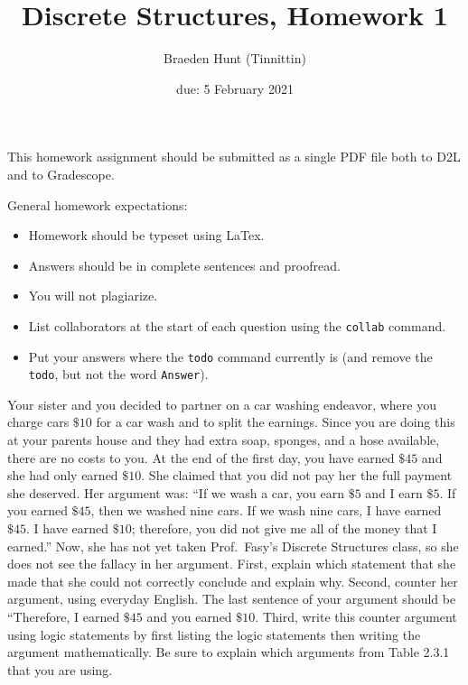 \documentclass{article}
\title{Discrete Structures, Homework 1}
\author{Braeden Hunt (Tinnittin)}
\date{due: 5 February 2021}
\begin{document}
\maketitle

This homework assignment should be
submitted as a single PDF file both to D2L and to Gradescope.

General homework expectations:
\begin{itemize}
    \item Homework should be typeset using LaTex.
    \item Answers should be in complete sentences and proofread.
    \item You will not plagiarize.  \item List collaborators at the start of each question using the \texttt{collab} command.
    \item Put your answers where the \texttt{todo} command currently is (and
        remove the \texttt{todo}, but not the word \texttt{Answer}).
\end{itemize}

 
Your sister and you decided to partner on a car washing endeavor, where you
charge cars $\$10$ for a car wash and to split the earnings.  Since you are
doing this at your parents house and they had extra soap, sponges, and a hose
available, there are no costs to you.  At the end of the first day, you have
earned $\$45$ and she had only earned $\$10$. She claimed that you did not pay
her the full payment she deserved. Her argument was: ``If we wash a car, you
earn $\$5$ and I earn $\$5$.  If you earned $\$45$, then we washed nine cars.  If
we wash nine cars, I have earned $\$45$.  I have earned $\$10$; therefore, you
did not give me all of the money that I earned.''  Now, she has not yet taken
Prof.~Fasy's Discrete Structures class, so she does not see the fallacy in her
argument. First, explain which statement that she made that she could not
correctly conclude and explain why.  Second, counter her argument, using
everyday English. The last sentence of your argument should be ``Therefore, I
earned $\$45$ and you earned $\$10$. Third, write this counter argument using
logic statements by first listing the logic statements then writing the argument
mathematically.  Be sure to explain which arguments from Table 2.3.1 that you
are using.
\end{document}
